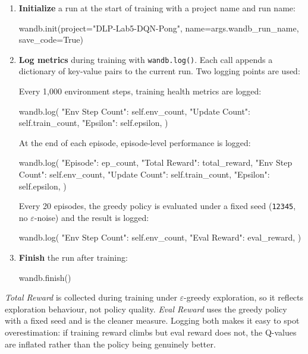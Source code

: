 \documentclass[12pt,a4paper]{report}
\begin{document}
\begin{enumerate}[leftmargin=2em]
  \item \textbf{Initialize} a run at the start of training with a project name and run name:
\begin{pycode}
wandb.init(project="DLP-Lab5-DQN-Pong", name=args.wandb_run_name, save_code=True)
\end{pycode}

  \item \textbf{Log metrics} during training with \texttt{wandb.log()}.
        Each call appends a dictionary of key-value pairs to the current run.
        Two logging points are used:

        Every 1,000 environment steps, training health metrics are logged:
\begin{pycode}
wandb.log({
    "Env Step Count": self.env_count,
    "Update Count":   self.train_count,
    "Epsilon":        self.epsilon,
})
\end{pycode}

        At the end of each episode, episode-level performance is logged:
\begin{pycode}
wandb.log({
    "Episode":        ep_count,
    "Total Reward":   total_reward,
    "Env Step Count": self.env_count,
    "Update Count":   self.train_count,
    "Epsilon":        self.epsilon,
})
\end{pycode}

        Every 20 episodes, the greedy policy is evaluated under a fixed seed
        (\texttt{12345}, no $\varepsilon$-noise) and the result is logged:
\begin{pycode}
wandb.log({
    "Env Step Count": self.env_count,
    "Eval Reward":    eval_reward,
})
\end{pycode}

  \item \textbf{Finish} the run after training:
\begin{pycode}
wandb.finish()
\end{pycode}
\end{enumerate}

\textit{Total Reward} is collected during training under $\varepsilon$-greedy exploration,
so it reflects exploration behaviour, not policy quality.
\textit{Eval Reward} uses the greedy policy with a fixed seed and is the cleaner measure.
Logging both makes it easy to spot overestimation: if training reward climbs but eval reward
does not, the Q-values are inflated rather than the policy being genuinely better.
\end{document}
